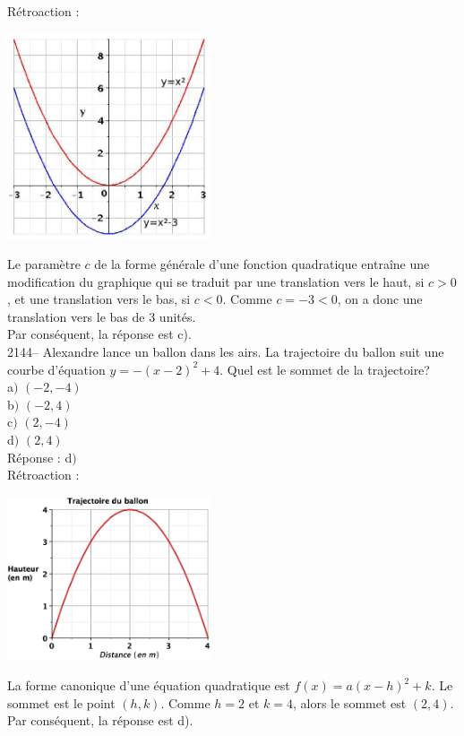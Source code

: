 \documentclass[letterpaper, 12pt]{article}
\begin{document}
R\'etroaction :\\
\begin{center}
 \includegraphics[width=6cm,bb=14 14 415 415]{Q2143.eps}
\end{center}
Le param\`etre $c$ de la forme g\'en\'erale d'une fonction quadratique entra\^ine une modification du graphique qui se traduit par une translation vers le haut, si $c>0$, et une translation vers le bas, si $c<0$. Comme $c=-3<0$, on a donc une translation vers le bas de 3 unit\'es. \\
Par cons\'equent, la r\'eponse est c).\\

2144-- Alexandre lance un ballon dans les airs. La trajectoire du ballon suit une courbe d'\'equation $y=-(x-2)^{2}+4$. Quel est le sommet de la trajectoire?\\

a$)$ $(-2, -4)$\\
b$)$ $(-2, 4)$\\
c$)$ $(2, -4)$\\
d$)$ $(2, 4)$\\

R\'eponse : d$)$\\

R\'etroaction :\\
\begin{center}
 \includegraphics[width=6cm,bb=20 186 575 605]{Q2144a.eps}
\end{center}
La forme canonique d'une \'equation quadratique est $f(x)=a(x-h)^{2}+k$. Le sommet est le point $(h,k)$. Comme $h=2$ et $k=4$, alors le sommet est $(2, 4)$.\\
Par cons\'equent, la r\'eponse est d).\\
\end{document}
